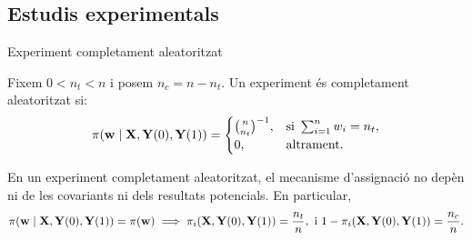 \documentclass{bestbeamer}
\begin{document}
\subsection{Estudis experimentals}
\begin{frame}{Experiment completament aleatoritzat}
\begin{definition}\label{def:experiment-completament-aleatoritzat}
Fixem $0<n_t<n$ i posem $n_c=n-n_t$. Un experiment és completament aleatoritzat si:
\begin{equation*}
\pi(\mathbf{w}\mid \mathbf{X},\mathbf{Y}(0),\mathbf{Y}(1))
=
\begin{cases}
\binom{n}{n_t}^{-1}, & \text{si } \sum_{i=1}^n w_i=n_t,\\
0, & \text{altrament}.
\end{cases}
\end{equation*}
\end{definition}
\begin{prop}\label{prop:aleatoritzacio-no-confusio}
En un experiment completament aleatoritzat, el mecanisme d'assignació no depèn ni de les covariants ni dels resultats potencials. En particular,
\begin{equation*}
\pi(\mathbf{w}\mid \mathbf{X},\mathbf{Y}(0),\mathbf{Y}(1))=\pi(\mathbf{w})\implies
\pi_i(\mathbf{X},\mathbf{Y}(0),\mathbf{Y}(1))=\frac{n_t}{n},\text{ i }
1-\pi_i(\mathbf{X},\mathbf{Y}(0),\mathbf{Y}(1))=\frac{n_c}{n}.
\end{equation*}
\end{prop}
\end{frame}
\end{document}
